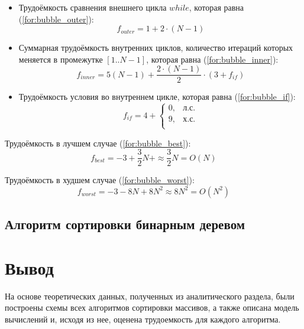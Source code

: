 \begin{itemize}
	\item Трудоёмкость сравнения внешнего цикла $while$, которая равна (\ref{for:bubble_outer}):
	\begin{equation}
		\label{for:bubble_outer}
		f_{outer} = 1 + 2 \cdot (N - 1)
	\end{equation}
	\item Суммарная трудоёмкость внутренних циклов, количество итераций которых меняется в промежутке $[1..N-1]$, которая равна (\ref{for:bubble_inner}):
	\begin{equation}
		\label{for:bubble_inner}
		f_{inner} = 5(N - 1) + \frac{2 \cdot (N - 1)}{2} \cdot (3 + f_{if})
	\end{equation}
	\item Трудоёмкость условия во внутреннем цикле, которая равна (\ref{for:bubble_if}):
	\begin{equation}
		\label{for:bubble_if}
		f_{if} = 4 + \begin{cases}
			0, & \text{л.с.}\\
			9, & \text{х.с.}\\
		\end{cases}
	\end{equation}
\end{itemize}

Трудоёмкость в лучшем случае (\ref{for:bubble_best}):
\begin{equation}
	\label{for:bubble_best}
	f_{best} = -3 + \frac{3}{2} N + \approx \frac{3}{2} N = O(N)
\end{equation}

Трудоёмкость в худшем случае (\ref{for:bubble_worst}):
\begin{equation}
	\label{for:bubble_worst}
	f_{worst} = -3 - 8N + 8N^2 \approx 8N^2 = O(N^2)
\end{equation}

\subsection{Алгоритм сортировки бинарным деревом}

\section{Вывод}
На основе теоретических данных, полученных из аналитического раздела, были построены схемы всех алгоритмов сортировки массивов, а также описана модель вычислений и, исходя из нее, оценена трудоемкость для каждого алгоритма. 